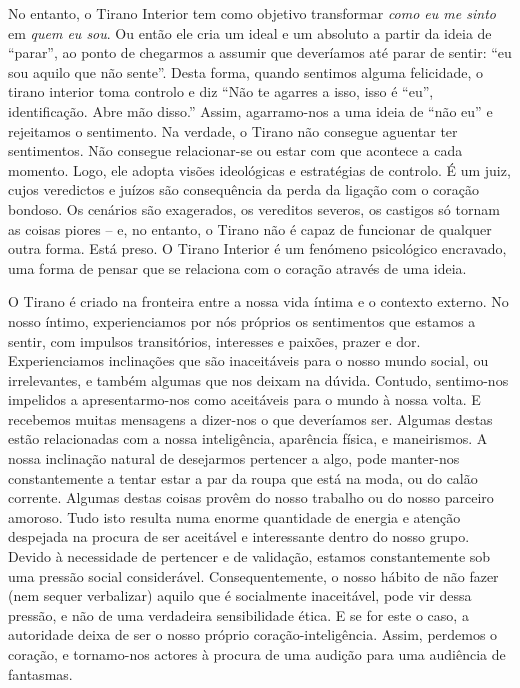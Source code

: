 \sectionBreak

No entanto, o Tirano Interior tem como objetivo transformar \emph{como
eu me sinto} em \emph{quem eu sou}. Ou então ele cria um ideal e um
absoluto a partir da ideia de “parar”, ao ponto de chegarmos a assumir
que deveríamos até parar de sentir: “eu sou aquilo que não sente”. Desta
forma, quando sentimos alguma felicidade, o tirano interior toma
controlo e diz “Não te agarres a isso, isso é “eu”, identificação. Abre
mão disso.” Assim, agarramo-nos a uma ideia de “não eu” e rejeitamos o
sentimento. Na verdade, o Tirano não consegue aguentar ter sentimentos.
Não consegue relacionar-se ou estar com que acontece a cada momento.
Logo, ele adopta visões ideológicas e estratégias de controlo. É um
juiz, cujos veredictos e juízos são consequência da perda da ligação com
o coração bondoso. Os cenários são exagerados, os vereditos severos, os
castigos só tornam as coisas piores -- e, no entanto, o Tirano não é
capaz de funcionar de qualquer outra forma. Está preso. O Tirano
Interior é um fenómeno psicológico encravado, uma forma de pensar que se
relaciona com o coração através de uma ideia.

O Tirano é criado na fronteira entre a nossa vida íntima e o contexto
externo. No nosso íntimo, experienciamos por nós próprios os sentimentos
que estamos a sentir, com impulsos transitórios, interesses e paixões,
prazer e dor. Experienciamos inclinações que são inaceitáveis para o
nosso mundo social, ou irrelevantes, e também algumas que nos deixam na
dúvida. Contudo, sentimo-nos impelidos a apresentarmo-nos como
aceitáveis para o mundo à nossa volta. E recebemos muitas mensagens a
dizer-nos o que deveríamos ser. Algumas destas estão relacionadas com a
nossa inteligência, aparência física, e maneirismos. A nossa inclinação
natural de desejarmos pertencer a algo, pode manter-nos constantemente a
tentar estar a par da roupa que está na moda, ou do calão corrente.
Algumas destas coisas provêm do nosso trabalho ou do nosso parceiro
amoroso. Tudo isto resulta numa enorme quantidade de energia e atenção
despejada na procura de ser aceitável e interessante dentro do nosso
grupo. Devido à necessidade de pertencer e de validação, estamos
constantemente sob uma pressão social considerável. Consequentemente, o
nosso hábito de não fazer (nem sequer verbalizar) aquilo que é
socialmente inaceitável, pode vir dessa pressão, e não de uma verdadeira
sensibilidade ética. E se for este o caso, a autoridade deixa de ser o
nosso próprio coração-inteligência. Assim, perdemos o coração, e
tornamo-nos actores à procura de uma audição para uma audiência de
fantasmas.

